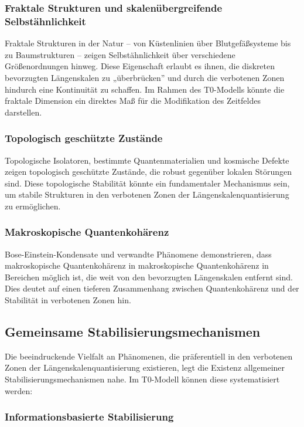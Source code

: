 \documentclass[12pt,a4paper]{article}
\begin{document}
	\subsubsection{Fraktale Strukturen und skalenübergreifende Selbstähnlichkeit}
	
	Fraktale Strukturen in der Natur – von Küstenlinien über Blutgefäßsysteme bis zu Baumstrukturen – zeigen Selbstähnlichkeit über verschiedene Größenordnungen hinweg. Diese Eigenschaft erlaubt es ihnen, die diskreten bevorzugten Längenskalen zu „überbrücken'' und durch die verbotenen Zonen hindurch eine Kontinuität zu schaffen. Im Rahmen des T0-Modells könnte die fraktale Dimension ein direktes Maß für die Modifikation des Zeitfeldes darstellen.
	
	\subsubsection{Topologisch geschützte Zustände}
	
	Topologische Isolatoren, bestimmte Quantenmaterialien und kosmische Defekte zeigen topologisch geschützte Zustände, die robust gegenüber lokalen Störungen sind. Diese topologische Stabilität könnte ein fundamentaler Mechanismus sein, um stabile Strukturen in den verbotenen Zonen der Längenskalenquantisierung zu ermöglichen.
	
	\subsubsection{Makroskopische Quantenkohärenz}
	
	Bose-Einstein-Kondensate und verwandte Phänomene demonstrieren, dass makroskopische Quantenkohärenz in 
	makroskopische Quantenkohärenz in Bereichen möglich ist, die weit von den bevorzugten Längenskalen entfernt sind. Dies deutet auf einen tieferen Zusammenhang zwischen Quantenkohärenz und der Stabilität in verbotenen Zonen hin.
	
	\subsection{Gemeinsame Stabilisierungsmechanismen}
	
	Die beeindruckende Vielfalt an Phänomenen, die präferentiell in den verbotenen Zonen der Längenskalenquantisierung existieren, legt die Existenz allgemeiner Stabilisierungsmechanismen nahe. Im T0-Modell können diese systematisiert werden:
	
	\subsubsection{Informationsbasierte Stabilisierung}
	
\end{document}
